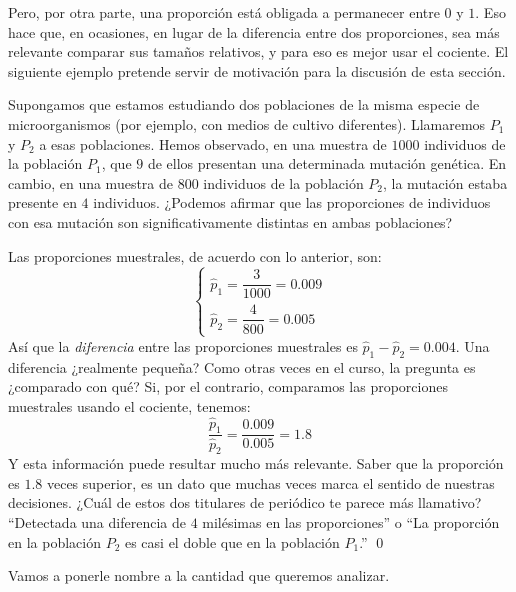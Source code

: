 Pero, por otra parte, una proporción está obligada a permanecer entre $0$ y $1$. Eso hace que, en ocasiones, en lugar de la diferencia entre dos proporciones, sea más relevante comparar sus tamaños relativos, y para eso es mejor usar el cociente. El siguiente ejemplo pretende servir de motivación para la discusión de esta sección.
\begin{ejemplo}
Supongamos que estamos estudiando dos poblaciones de la misma especie de microorganismos (por ejemplo, con medios de cultivo diferentes). Llamaremos $P_1$ y $P_2$ a esas poblaciones. Hemos observado, en una muestra de $1000$ individuos de la población $P_1$, que $9$ de ellos presentan una determinada mutación genética. En cambio, en una muestra de $800$ individuos de la población $P_2$, la mutación estaba presente en $4$ individuos. ¿Podemos afirmar que las proporciones de individuos con esa mutación son significativamente distintas en ambas poblaciones?

Las proporciones muestrales, de acuerdo con lo anterior, son:
    \[
    \begin{cases}
        \hat p_1=\dfrac{3}{1000}=0.009\\[3mm]
        \hat p_2=\dfrac{4}{800}=0.005
    \end{cases}
    \]
Así que la {\em diferencia} entre las proporciones muestrales es $\hat p_1-\hat p_2=0.004$. Una diferencia ¿realmente pequeña? Como otras veces en el curso, la pregunta es ¿comparado con qué? Si, por el contrario, comparamos las proporciones muestrales usando el cociente, tenemos:
\[\dfrac{\hat p_1}{\hat p_2}=\dfrac{0.009}{0.005}=1.8\]
Y esta información puede resultar mucho más relevante. Saber que la proporción es $1.8$ veces superior, es un dato que muchas veces marca el sentido de nuestras decisiones. ¿Cuál de estos dos titulares de periódico te parece más llamativo? ``Detectada una diferencia de $4$ milésimas en las proporciones'' o ``La proporción en la población $P_2$ es casi el doble que en la población $P_1$.''
\qed
\end{ejemplo}

Vamos a ponerle nombre a la cantidad que queremos analizar.
\begin{center}
\end{center}

